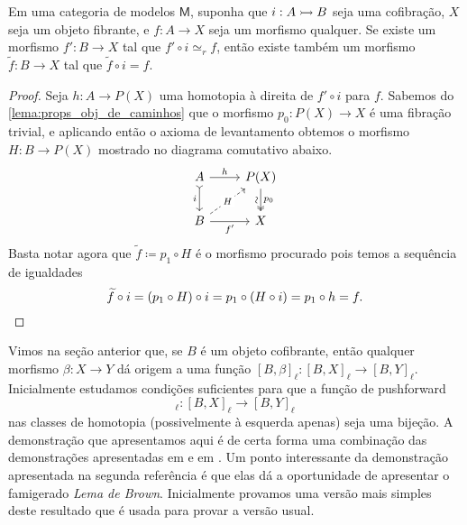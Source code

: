 \begin{lema}
  \label{lema:extensao_a_menos_de_homotopia}
  Em uma categoria de modelos $\mathsf{M}$, suponha que $i: A \rightarrowtail B$ seja uma cofibração, $X$ seja um objeto fibrante, e $f: A \to X$ seja um morfismo qualquer.
  Se existe um morfismo $f': B \to X$ tal que $f' \circ i \simeq_{r} f$, então existe também um morfismo $\widetilde{f}: B \to X$ tal que $\widetilde{f} \circ i = f$.
\end{lema}

\begin{proof}
  Seja $h: A \to P(X)$ uma homotopia à direita de $f' \circ i $ para $f$.
  Sabemos do \cref{lema:props_obj_de_caminhos} que o morfismo $p_{0}: P(X) \to X$ é uma fibração trivial, e aplicando então o axioma de levantamento obtemos o morfismo $H: B \to P(X)$ mostrado no diagrama comutativo abaixo.
  \begin{displaymath}
    \begin{tikzcd}
      A
      \arrow[d, tail, "i" swap]
      \arrow[r, "h"]
      & P(X)
      \arrow[d, two heads, "p_{0}", "\sim" {swap,sloped}]
      \\ B
      \arrow[r, "f'" swap]
      \arrow[ru, dashed, "H" description]
      & X
    \end{tikzcd}
  \end{displaymath}
  Basta notar agora que $\widetilde{f} \coloneqq p_{1} \circ H$ é o morfismo procurado pois temos a sequência de igualdades
  \begin{displaymath}
    \widetilde{f} \circ i = (p_{1} \circ H) \circ i = p_{1} \circ (H \circ i) = p_{1} \circ h = f. \qedhere
  \end{displaymath}
\end{proof}

Vimos na seção anterior que, se $B$ é um objeto cofibrante, então qualquer morfismo $\beta: X \to Y$ dá origem a uma função $[B,\beta]_{\ell}: [B,X]_{\ell} \to [B,Y]_{\ell}$.
Inicialmente estudamos condições suficientes para que a função de pushforward
\begin{displaymath}
  [B,p]_{\ell}: [B,X]_{\ell} \to [B,Y]_{\ell}
\end{displaymath}
nas classes de homotopia (possivelmente à esquerda apenas) seja uma bijeção.
A demonstração que apresentamos aqui é de certa forma uma combinação das demonstrações apresentadas em \cite[Proposição 7.25]{heuts_simplicial_2022} e em \cite[Proposição 1.2.5]{hovey}.
Um ponto interessante da demonstração apresentada na segunda referência é que elas dá a oportunidade de apresentar o famigerado \emph{Lema de Brown}.
Inicialmente provamos uma versão mais simples deste resultado que é usada para provar a versão usual.

